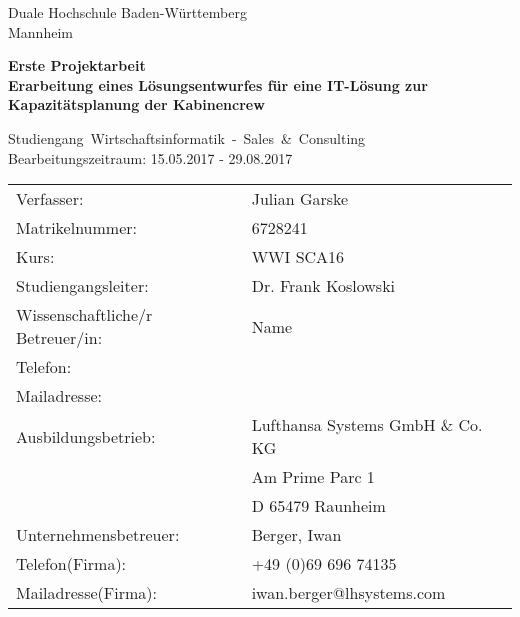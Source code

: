 \documentclass [12pt, a4paper, oneside, titlepage, ngerman]{article}
\begin{document}
\begin{titlepage}
\Large
\begin{minipage}{\textwidth} \centering \Large
     Duale Hochschule Baden-Württemberg \\  
     Mannheim 
\end{minipage} \vspace{1cm}

\begin{minipage}{\textwidth} \centering \Large
     \textbf{Erste Projektarbeit \\ Erarbeitung eines Lösungsentwurfes für eine IT-Lösung zur Kapazitätsplanung der Kabinencrew}
\end{minipage} \vspace{1cm}

\begin{minipage}{\textwidth} \centering \Large
     \mbox{Studiengang Wirtschaftsinformatik - Sales \& Consulting}\\  \large Bearbeitungszeitraum: 15.05.2017 - 29.08.2017
\end{minipage} \vspace{1cm}


\begin{table}[h!]
  \begin{tabular}{ll}
Verfasser: & Julian Garske \\
Matrikelnummer: & 6728241 \vspace{0.5cm} \\ 
Kurs: & WWI SCA16 \\
Studiengangsleiter:& Dr. Frank Koslowski \vspace{0.5cm} \\
Wissenschaftliche/r Betreuer/in: &Name \\ 
Telefon:& \\ 
Mailadresse:& \vspace{0.5cm}\\
Ausbildungsbetrieb: &Lufthansa Systems GmbH \& Co. KG \\ 
& Am Prime Parc 1 \\ 
& D 65479 Raunheim \vspace{0.5cm}\\
Unternehmensbetreuer: &Berger, Iwan \\ 
Telefon(Firma): &+49 (0)69 696 74135 \\
 Mailadresse(Firma):& iwan.berger@lhsystems.com \\
  \end{tabular}
\end{table}



\end{titlepage}
\end{document}
